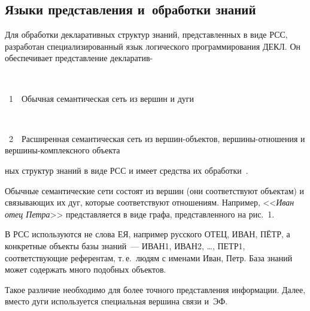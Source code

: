 \begin{multicols}{2}
\vspace*{-6pt}

\section{Языки представления и~обработки знаний} %

 Для обработки декларативных структур знаний, представленных в виде
РСС, разработан специализированный язык логического программирования
ДЕКЛ. Он обеспечивает представление декларатив-\linebreak\vspace*{-12pt}
\noindent
\begin{center}  %
\mbox{%
\epsfxsize=76.56mm
}
  \vspace*{5pt}

{{\figurename~1}\ \ \small{Обычная семантическая сеть из вершин и дуги}}
  \end{center}

\vspace*{8pt}



\begin{center}
\mbox{%
\epsfxsize=72.092mm
}
\end{center}

\noindent
{{\figurename~2}\ \ \small{Расширенная семантическая сеть
из вер\-шин-объ\-ек\-тов, вер\-ши\-ны-от\-но\-ше\-ния и
вер\-ши\-ны-комп\-лек\-сно\-го объ\-ек\-та}}

\addtocounter{figure}{2}

\vspace*{8pt}

\noindent
ных структур знаний в виде
РСС и имеет средства их обработки~\cite{ ma-l4, ma-l5}.

 Обычные семантические сети состоят из вершин (они соответствуют
объектам) и связывающих их дуг, которые соответствуют отношениям.
Например, <<\textit{Иван отец Петра}>> представляется в виде графа,
представленного на рис.~1.


 В РСС используются не слова ЕЯ, например русского
ОТЕЦ, ИВАН, ПЁТР, а конкретные объекты базы знаний~--- ИВАН1, ИВАН2,
\ldots, ПЕТР1, соответствующие референтам, т.\,е.\ людям с именами Иван,
Петр. База знаний может содержать много подобных объектов.

 Такое различие необходимо для более точного представления
информации. Далее, вместо дуги используется специальная вершина связи и~ЭФ.



\end{multicols}
